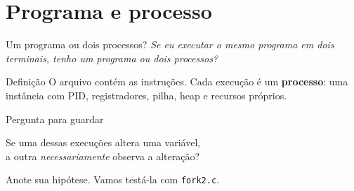 \documentclass[aspectratio=169]{beamer}
\begin{document}
\section{Programa e processo}

\begin{frame}{Um programa ou dois processos?}
\emph{Se eu executar o mesmo programa em dois terminais, tenho um programa ou dois processos?}

\vspace{0.8em}
\begin{center}
\end{center}

\pause
\begin{alertblock}{Definição}
O arquivo contém as instruções. Cada execução é um \textbf{processo}: uma instância com PID, registradores, pilha, heap e recursos próprios.
\end{alertblock}
\end{frame}

\begin{frame}{Pergunta para guardar}
\begin{center}
{\large Se uma dessas execuções altera uma variável,\\[0.3em]
a outra \emph{necessariamente} observa a alteração?}
\end{center}

\vspace{1.5em}
\centering Anote sua hipótese. Vamos testá-la com \texttt{fork2.c}.
\end{frame}
\end{document}
